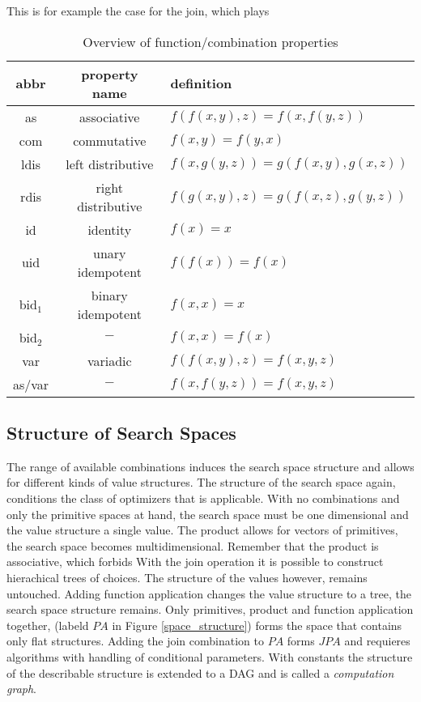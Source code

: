 \documentclass[english]{article}
\begin{document}
This is for example the case for the join, which plays


\begin{table}
\centering
\begin{tabular}{c | c | l}
abbr & property name & definition \\
\hline
as               & associative        & $f(f(x,y),z) = f(x,f(y,z))$ \\
com              & commutative        & $f(x,y)=f(y,x)$ \\
ldis             & left distributive  & $f(x,g(y,z))=g(f(x,y),g(x,z))$ \\
rdis             & right distributive & $f(g(x,y),z)=g(f(x,z),g(y,z))$ \\
id               & identity           & $f(x) = x$ \\
uid              & unary idempotent   & $f(f(x)) = f(x)$ \\
bid$_{\text{1}}$ & binary idempotent  & $f(x,x) = x$ \\
bid$_{\text{2}}$ & \multicolumn{1}{|c|}{$-$} & $f(x,x) = f(x)$ \\
var              & variadic           & $f(f(x,y),z) = f(x,y,z)$\\
as/var           & \multicolumn{1}{|c|}{$-$} & $f(x,f(y,z)) = f(x,y,z)$ \\
\end{tabular}
\caption{Overview of function/combination properties}
\label{funcprops}
\end{table}


\subsection{Structure of Search Spaces}
The range of available combinations induces the search space structure and allows for different kinds of value structures. The structure of the search space again, conditions the class of optimizers that is applicable.
With no combinations and only the primitive spaces at hand, the search space must be one dimensional and the value structure a single value.
The product allows for vectors of primitives, the search space becomes multidimensional. Remember that the product is associative, which forbids
With the join operation it is possible to construct hierachical trees of choices. The structure of the values however, remains untouched.
Adding function application changes the value structure to a tree, the search space structure remains.
Only primitives, product and function application together, (labeld $PA$ in Figure \ref{space_structure}) forms the space that contains only flat structures. Adding the join combination to $PA$ forms $JPA$ and requieres algorithms with handling of conditional parameters.
With constants the structure of the describable structure is extended to a DAG and is called a \textit{computation graph}.
\end{document}
